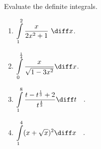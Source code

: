 Evaluate the definite integrals.
\begin{multicols}{2}
\begin{enumerate}[ref={\fcProblemRef}]
\item $\displaystyle\int\limits_{1}^{2} \frac{x}{2x^2+1 }  ~\diff x$.

\item $\displaystyle\int\limits_{0}^{\frac{1}4}\frac{x }{\sqrt{1-3x^2}}\diff x$.


\item $\displaystyle\int\limits_{1}^{8} \frac{t-t^{\frac{1}{3}} +2}{t^{ \frac{4}{3 } } } \diff t\quad .$

\item $\displaystyle\int\limits_{1}^{4} (x+\sqrt{x})^2 \diff x\quad .$


\end{enumerate}
\end{multicols}
